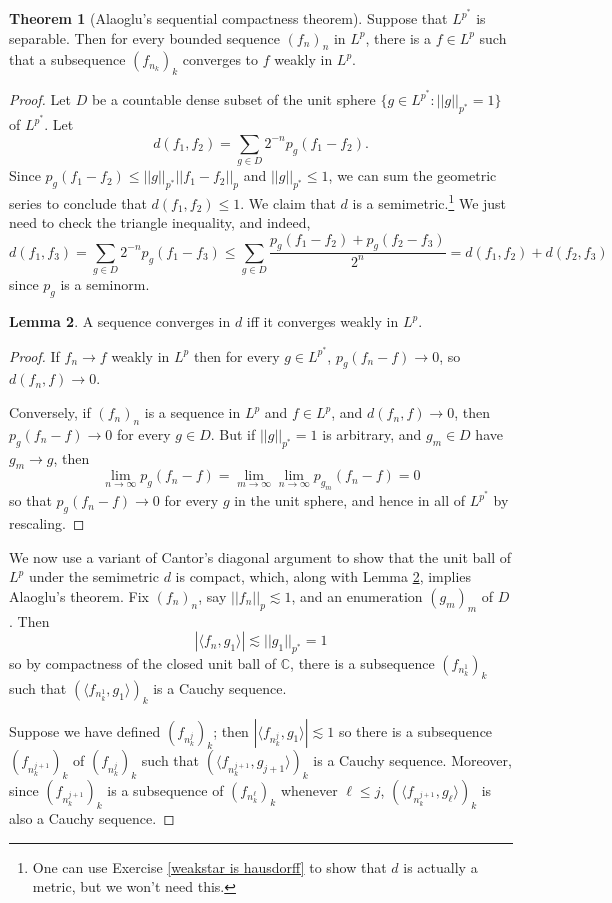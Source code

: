 \documentclass[12pt]{book}
\newcommand{\CC}{\mathbb{C}}
\theoremstyle{definition}
\newtheorem{theorem}{Theorem}[section]
\newtheorem{lemma}[theorem]{Lemma}
\begin{document}
\begin{theorem}[Alaoglu's sequential compactness theorem]
Suppose that $L^{p^*}$ is separable. Then for every bounded sequence $(f_n)_n$ in $L^p$, there is a $f \in L^p$ such that a subsequence $(f_{n_k})_k$ converges to $f$ weakly in $L^p$.
\end{theorem}
\begin{proof}
Let $D$ be a countable dense subset of the unit sphere $\{g \in L^{p^*}: ||g||_{p^*} = 1\}$ of $L^{p^*}$.
Let
$$d(f_1, f_2) = \sum_{g \in D} 2^{-n} p_g(f_1 - f_2).$$
Since $p_g(f_1 - f_2) \leq ||g||_{p^*} ||f_1 - f_2||_p$ and $||g||_{p^*} \leq 1$, we can sum the geometric series to conclude that $d(f_1, f_2) \leq 1$.
We claim that $d$ is a semimetric.\footnote{One can use Exercise \ref{weakstar is hausdorff} to show that $d$ is actually a metric, but we won't need this.}
We just need to check the triangle inequality, and indeed,
$$d(f_1, f_3) = \sum_{g \in D} 2^{-n} p_g(f_1 - f_3) \leq \sum_{g \in D} \frac{p_g(f_1 - f_2) + p_g(f_2 - f_3)}{2^n} = d(f_1, f_2) + d(f_2, f_3)$$
since $p_g$ is a seminorm.

\begin{lemma}
\label{weakstar semimetric}
A sequence converges in $d$ iff it converges weakly in $L^p$.
\end{lemma}
\begin{proof}
If $f_n \to f$ weakly in $L^p$ then for every $g \in L^{p^*}$, $p_g(f_n - f) \to 0$, so $d(f_n, f) \to 0$.

Conversely, if $(f_n)_n$ is a sequence in $L^p$ and $f \in L^p$, and $d(f_n, f) \to 0$, then $p_g(f_n - f) \to 0$ for every $g \in D$.
But if $||g||_{p^*} = 1$ is arbitrary, and $g_m \in D$ have $g_m \to g$, then
$$\lim_{n \to \infty} p_g(f_n - f) = \lim_{m \to \infty} \lim_{n \to \infty} p_{g_m}(f_n - f) = 0$$
so that $p_g(f_n - f) \to 0$ for every $g$ in the unit sphere, and hence in all of $L^{p^*}$ by rescaling.
\end{proof}

We now use a variant of Cantor's diagonal argument to show that the unit ball of $L^p$ under the semimetric $d$ is compact, which, along with Lemma \ref{weakstar semimetric}, implies Alaoglu's theorem.
Fix $(f_n)_n$, say $||f_n||_p \lesssim 1$, and an enumeration $(g_m)_m$ of $D$.
Then
$$|\langle f_n, g_1\rangle| \lesssim ||g_1||_{p^*} = 1$$
so by compactness of the closed unit ball of $\CC$, there is a subsequence $(f_{n_k^1})_k$ such that $(\langle f_{n_k^1}, g_1\rangle)_k$ is a Cauchy sequence.

Suppose we have defined $(f_{n_k^j})_k$; then $|\langle f_{n_k^j}, g_1\rangle| \lesssim 1$ so there is a subsequence $(f_{n_k^{j+1}})_k$ of $(f_{n_k^j})_k$ such that $(\langle f_{n_k^{j+1}}, g_{j+1}\rangle)_k$ is a Cauchy sequence.
Moreover, since $(f_{n_k^{j+1}})_k$ is a subsequence of $(f_{n_k^\ell})_k$ whenever $\ell \leq j$, $(\langle f_{n_k^{j+1}}, g_\ell\rangle)_k$ is also a Cauchy sequence.


\end{proof}
\end{document}
